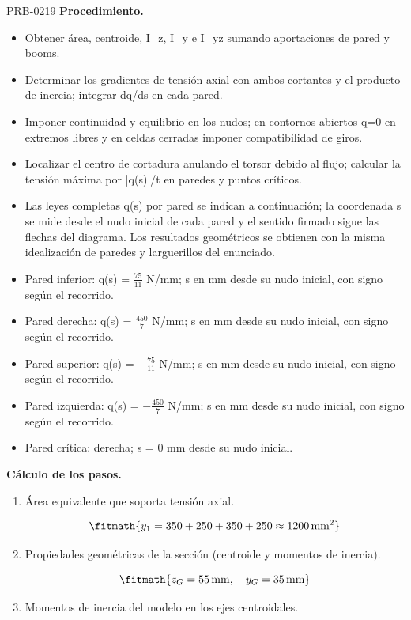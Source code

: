 \begin{studiumworked}{PRB-0219}
\textbf{Procedimiento.}\begin{itemize}\item Obtener área, centroide, I\_z, I\_y e I\_yz sumando aportaciones de pared y booms.
\item Determinar los gradientes de tensión axial con ambos cortantes y el producto de inercia; integrar dq/ds en cada pared.
\item Imponer continuidad y equilibrio en los nudos; en contornos abiertos q=0 en extremos libres y en celdas cerradas imponer compatibilidad de giros.
\item Localizar el centro de cortadura anulando el torsor debido al flujo; calcular la tensión máxima por |q(s)|/t en paredes y puntos críticos.
\item Las leyes completas q(s) por pared se indican a continuación; la coordenada s se mide desde el nudo inicial de cada pared y el sentido firmado sigue las flechas del diagrama. Los resultados geométricos se obtienen con la misma idealización de paredes y larguerillos del enunciado.
\item Pared inferior: q(s) = $\frac{75}{11}$ N/mm; s en mm desde su nudo inicial, con signo según el recorrido.
\item Pared derecha: q(s) = $\frac{450}{7}$ N/mm; s en mm desde su nudo inicial, con signo según el recorrido.
\item Pared superior: q(s) = $- \frac{75}{11}$ N/mm; s en mm desde su nudo inicial, con signo según el recorrido.
\item Pared izquierda: q(s) = $- \frac{450}{7}$ N/mm; s en mm desde su nudo inicial, con signo según el recorrido.
\item Pared crítica: derecha; s = 0 mm desde su nudo inicial.\end{itemize}

\textbf{Cálculo de los pasos.}

\begin{enumerate}

\item Área equivalente que soporta tensión axial.

\[\fitmath{y_{1}=350+250+350+250\approx 1200\,\mathrm{mm^{2}}}\]

\item Propiedades geométricas de la sección (centroide y momentos de inercia).

\[\fitmath{z_G=55\,\mathrm{mm},\quad y_G=35\,\mathrm{mm}}\]

\item Momentos de inercia del modelo en los ejes centroidales.


\end{enumerate}
\end{studiumworked}
